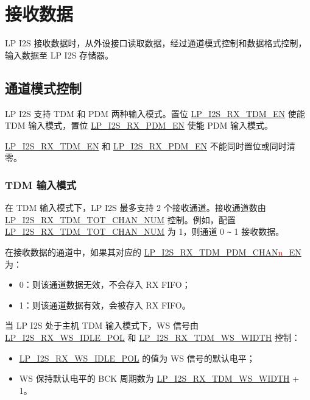 \documentclass[main\_\_CN.tex]{subfiles}
\begin{document}
\section{接收数据}\label{sec:lpi2s-rx-data}

LP I2S 接收数据时，从外设接口读取数据，经过通道模式控制和数据格式控制，输入数据至 LP I2S 存储器。

\subsection{通道模式控制}

\chipname{} LP I2S 支持 TDM 和 PDM 两种输入模式。置位 \hyperref[fielddesc:LPI2SRXTDMEN]{LP\_I2S\_RX\_TDM\_EN} 使能 TDM 输入模式，置位 \hyperref[fielddesc:LPI2SRXPDMEN]{LP\_I2S\_RX\_PDM\_EN} 使能 PDM 输入模式。

\begin{tiplisting}
\hyperref[fielddesc:LPI2SRXTDMEN]{LP\_I2S\_RX\_TDM\_EN} 和 \hyperref[fielddesc:LPI2SRXPDMEN]{LP\_I2S\_RX\_PDM\_EN} 不能同时置位或同时清零。
\end{tiplisting}
\vspace{-1em}

\subsubsection{TDM 输入模式} 

在 TDM 输入模式下，LP I2S 最多支持 2 个接收通道。接收通道数由 \hyperref[fielddesc:LPI2SRXTDMTOTCHANNUM]{LP\_I2S\_RX\_TDM\_TOT\_CHAN\_NUM} 控制。例如，配置 \hyperref[fielddesc:LPI2SRXTDMTOTCHANNUM]{LP\_I2S\_RX\_TDM\_TOT\_CHAN\_NUM} 为 1，则通道 0 \verb+~+ 1 接收数据。

在接收数据的通道中，如果其对应的 \hyperref[fielddesc:LPI2SRXTDMPDMCHAN0EN]{LP\_I2S\_RX\_TDM\_PDM\_CHAN{\textcolor{red}{n}}\_EN} 为：

\begin{itemize}
    \item 0：则该通道数据无效，不会存入 RX FIFO；
    \item 1：则该通道数据有效，会被存入 RX FIFO。
\end{itemize}

当 LP I2S 处于主机 TDM 输入模式下，WS 信号由 \hyperref[fielddesc:LPI2SRXWSIDLEPOL]{LP\_I2S\_RX\_WS\_IDLE\_POL} 和 \hyperref[fielddesc:LPI2SRXTDMWSWIDTH]{LP\_I2S\_RX\_TDM\_WS\_WIDTH} 控制：
\begin{itemize}
    \item \hyperref[fielddesc:LPI2SRXWSIDLEPOL]{LP\_I2S\_RX\_WS\_IDLE\_POL} 的值为 WS 信号的默认电平；
    \item WS 保持默认电平的 BCK 周期数为 \hyperref[fielddesc:LPI2SRXTDMWSWIDTH]{LP\_I2S\_RX\_TDM\_WS\_WIDTH} + 1。
\end{itemize}
\end{document}
